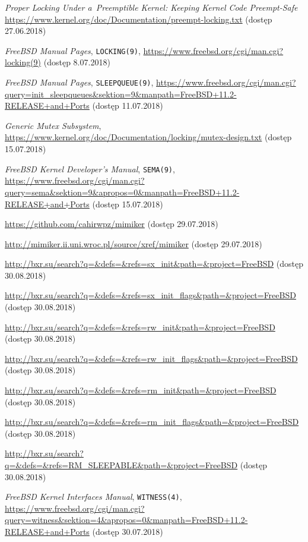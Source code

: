 \documentclass[shortabstract]{iithesis}
\theoremstyle{definition} \newtheorem*{definition}{Definicja}
\theoremstyle{definition} \newtheorem*{example}{Przykład}
\theoremstyle{definition} \newtheorem*{remark}{Uwaga}
\begin{document}
\begin{thebibliography}{99}
 \textit{Proper Locking Under a~Preemptible Kernel: Keeping Kernel Code Preempt-Safe}
\url{https://www.kernel.org/doc/Documentation/preempt-locking.txt} (dostęp 27.06.2018)

 \textit{FreeBSD Manual Pages}, \texttt{LOCKING(9)},
\url{https://www.freebsd.org/cgi/man.cgi?locking(9)} (dostęp 8.07.2018)

 \textit{FreeBSD Manual Pages}, \texttt{SLEEPQUEUE(9)},
\url{https://www.freebsd.org/cgi/man.cgi?query=init_sleepqueues&sektion=9&manpath=FreeBSD+11.2-RELEASE+and+Ports}
(dostęp 11.07.2018)

 \textit{Generic Mutex Subsystem},
\url{https://www.kernel.org/doc/Documentation/locking/mutex-design.txt} (dostęp 15.07.2018)

 \textit{ FreeBSD Kernel Developer's Manual}, \texttt{SEMA(9)},
\url{https://www.freebsd.org/cgi/man.cgi?query=sema&sektion=9&apropos=0&manpath=FreeBSD+11.2-RELEASE+and+Ports}
(dostęp 15.07.2018)

\url{https://github.com/cahirwpz/mimiker} (dostęp 29.07.2018)

\url{http://mimiker.ii.uni.wroc.pl/source/xref/mimiker} (dostęp 29.07.2018)

\url{http://bxr.su/search?q=&defs=&refs=sx_init&path=&project=FreeBSD}
(dostęp 30.08.2018)

\url{http://bxr.su/search?q=&defs=&refs=sx_init_flags&path=&project=FreeBSD}
(dostęp 30.08.2018)

\url{http://bxr.su/search?q=&defs=&refs=rw_init&path=&project=FreeBSD}
(dostęp 30.08.2018)

\url{http://bxr.su/search?q=&defs=&refs=rw_init_flags&path=&project=FreeBSD}
(dostęp 30.08.2018)

\url{http://bxr.su/search?q=&defs=&refs=rm_init&path=&project=FreeBSD}
(dostęp 30.08.2018)

\url{http://bxr.su/search?q=&defs=&refs=rm_init_flags&path=&project=FreeBSD}
(dostęp 30.08.2018)

\url{http://bxr.su/search?q=&defs=&refs=RM_SLEEPABLE&path=&project=FreeBSD}
(dostęp 30.08.2018)

 \textit{FreeBSD Kernel Interfaces Manual}, \texttt{WITNESS(4)},
\url{https://www.freebsd.org/cgi/man.cgi?query=witness&sektion=4&apropos=0&manpath=FreeBSD+11.2-RELEASE+and+Ports}
(dostęp 30.07.2018)


\end{thebibliography}
\end{document}
